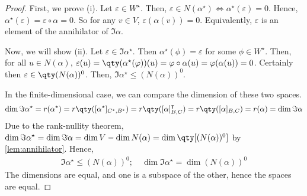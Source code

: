 \begin{proof}
	First, we prove (i).
	Let $\varepsilon \in W^\star$.
	Then, $\varepsilon \in N(\alpha^\star) \iff \alpha^\star(\varepsilon) = 0$.
	Hence, $\alpha^\star(\varepsilon) = \varepsilon \circ \alpha = 0$.
	So for any $v \in V$, $\varepsilon(\alpha(v)) = 0$.
	Equivalently, $\varepsilon$ is an element of the annihilator of $\Im \alpha$.

	Now, we will show (ii).
	Let $\varepsilon \in \Im \alpha^\star$.
	Then $\alpha^\star(\phi) = \varepsilon$ for some $\phi \in W^\star$.
	Then, for all $u \in N(\alpha)$, $\varepsilon(u) = \qty(\alpha^\star(\phi))(u) = \phi \circ \alpha(u) = \phi(\alpha(u)) = 0$.
	Certainly then $\varepsilon \in \qty(N(\alpha))^0$.
	Then, $\Im \alpha^\star \leq (N(\alpha))^0$.

	In the finite-dimensional case, we can compare the dimension of these two spaces.
	\begin{align*}
		\dim \Im \alpha^\star = r(\alpha^\star) = r\qty([\alpha^\star]_{C^\star, B^\star}) = r\qty([\alpha]_{B,C}^\transpose) = r\qty([\alpha]_{B,C}) = r(\alpha) = \dim \Im \alpha
	\end{align*}
	Due to the rank-nullity theorem, $\dim \Im \alpha^\star = \dim \Im \alpha = \dim V - \dim N(\alpha) = \dim\qty[(N(\alpha))^0]$ by \cref{lem:annihilator}.
	Hence,
	\begin{align*}
		\Im \alpha^\star \leq (N(\alpha))^0;\quad \dim \Im \alpha^\star = \dim (N(\alpha))^0
	\end{align*}
	The dimensions are equal, and one is a subspace of the other, hence the spaces are equal.
\end{proof}

